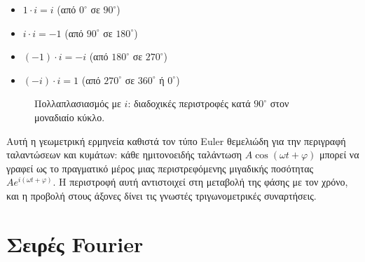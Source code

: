 \documentclass[a4paper, 11pt]{article}
\providecommand{\tightlist}{\setlength{\itemsep}{0pt}\setlength{\parskip}{0pt}}
\begin{document}
\begin{itemize}
\tightlist
\item
  \(1 \cdot i = i\) (από \(0^\circ\) σε \(90^\circ\))
\item
  \(i \cdot i = -1\) (από \(90^\circ\) σε \(180^\circ\))
\item
  \((-1) \cdot i = -i\) (από \(180^\circ\) σε \(270^\circ\))
\item
  \((-i) \cdot i = 1\) (από \(270^\circ\) σε \(360^\circ\) ή
  \(0^\circ\))
\end{itemize}

\begin{figure}[htbp]
\centering
{}
\caption{Πολλαπλασιασμός με $i$: διαδοχικές περιστροφές κατά $90^\circ$ στον μοναδιαίο κύκλο.}
\label{fig:i_rotation}
\end{figure}

Αυτή η γεωμετρική ερμηνεία καθιστά τον τύπο Euler θεμελιώδη για την
περιγραφή ταλαντώσεων και κυμάτων: κάθε ημιτονοειδής ταλάντωση
\(A\cos(\omega t + \varphi)\) μπορεί να γραφεί ως το πραγματικό μέρος
μιας περιστρεφόμενης μιγαδικής ποσότητας
\(A e^{i(\omega t + \varphi)}\). Η περιστροφή αυτή αντιστοιχεί στη
μεταβολή της φάσης με τον χρόνο, και η προβολή στους άξονες δίνει τις
γνωστές τριγωνομετρικές συναρτήσεις.

\section{Σειρές Fourier}\label{ux3c3ux3b5ux3b9ux3c1ux3adux3c2-fourier}
\end{document}
